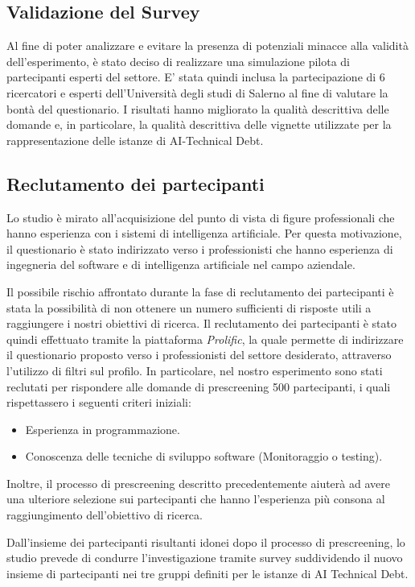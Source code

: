\subsection{Validazione del Survey}
Al fine di poter analizzare e evitare la presenza di potenziali minacce alla validità dell'esperimento, è stato deciso di realizzare una simulazione pilota di partecipanti esperti del settore. E' stata quindi inclusa la partecipazione di 6 ricercatori e esperti dell'Università degli studi di Salerno al fine di valutare la bontà del questionario.
I risultati hanno migliorato la qualità descrittiva delle domande e, in particolare, la qualità descrittiva delle vignette utilizzate per la rappresentazione delle istanze di AI-Technical Debt.

\subsection{Reclutamento dei partecipanti}
Lo studio è mirato all'acquisizione del punto di vista di figure professionali che hanno esperienza con i sistemi di intelligenza artificiale.
Per questa motivazione, il questionario è stato indirizzato verso i professionisti che hanno esperienza di ingegneria del software e di intelligenza artificiale nel campo aziendale.

Il possibile rischio affrontato durante la fase di reclutamento dei partecipanti è stata la possibilità di non ottenere un numero sufficienti di risposte utili a raggiungere i nostri obiettivi di ricerca. 
Il reclutamento dei partecipanti è stato quindi effettuato tramite la piattaforma \textit{Prolific}, la quale permette di indirizzare il questionario proposto verso i professionisti del settore desiderato, attraverso l'utilizzo di filtri sul profilo.
In particolare, nel nostro esperimento sono stati reclutati per rispondere alle domande di prescreening 500 partecipanti, i quali rispettassero i seguenti criteri iniziali:
\begin{itemize}
    \item Esperienza in programmazione.
    \item Conoscenza delle tecniche di sviluppo software (\eg Monitoraggio o testing).
\end{itemize}
Inoltre, il processo di prescreening descritto precedentemente aiuterà ad avere una ulteriore selezione sui partecipanti che hanno l'esperienza più consona al raggiungimento dell'obiettivo di ricerca.

Dall'insieme dei partecipanti risultanti idonei dopo il processo di prescreening, lo studio prevede di condurre l'investigazione tramite survey suddividendo il nuovo insieme di partecipanti nei tre gruppi definiti per le istanze di AI Technical Debt.


